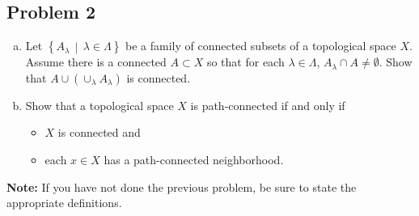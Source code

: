 \documentclass[12pt]{article}
\newcommand\setb[1]{\left \{ #1 \right \}}
\theoremstyle{definition}
\begin{document}
\subsection{Problem 2}
\begin{enumerate}[(a)]
    \item Let $\setb{ A_{\lambda} \, \middle| \, \lambda \in \Lambda }$ be a family of connected subsets of a topological space $X$. Assume there is a connected $A \subset X$ so that for each $\lambda \in \Lambda$, $A_{\lambda} \cap A \neq \emptyset$. Show that $A \cup ( \cup_{\lambda} A_{\lambda} )$ is connected.
    \item Show that a topological space $X$ is path-connected if and only if 
    \begin{itemize}
        \item $X$ is connected and 
        \item each $x \in X$ has a path-connected neighborhood.
    \end{itemize}
\end{enumerate}
\textbf{Note:} If you have not done the previous problem, be sure to state the appropriate definitions.
\end{document}
